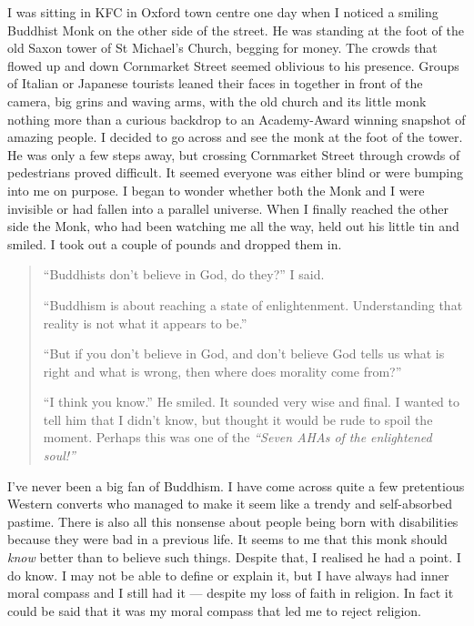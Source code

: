 \documentclass[12pt]{memoir}
\def\–{-\hskip0pt}
\begin{document}
I was sitting in KFC in Oxford town centre one day
when I noticed a smiling Buddhist Monk on the other side of the street.
He was standing at the foot of the old Saxon tower of St Michael’s Church,
begging for money.
The crowds that flowed up and down Cornmarket Street
seemed oblivious to his presence.
Groups of Italian or Japanese tourists leaned their faces
in together in front of the camera,
big grins and waving arms,
with the old church and its little monk nothing more than a curious
backdrop to an Academy-Award winning snapshot of amazing people.
I decided to go across and see the monk at the foot of the tower.
He was only a few steps away, but crossing Cornmarket Street
through crowds of pedestrians proved difficult.
It seemed everyone was either blind or were bumping into me on purpose.
I began to wonder whether both the Monk and I were invisible
or had fallen into a parallel universe.
When I finally reached the other side the Monk,
who had been watching me all the way,
held out his little tin and smiled.
I took out a couple of pounds and dropped them in.

\begin{quote}
“Buddhists don’t believe in God, do they?” I said.

“Buddhism is about reaching a state of enlightenment.
Understanding that reality is not what it appears to be.”

“But if you don’t believe in God,
and don’t believe God tells us what is right and what is wrong,
then where does morality come from?”

“I think you know.” He smiled.
It sounded very wise and final.
I wanted to tell him that I didn’t know,
but thought it would be rude to spoil the moment.
Perhaps this was one of the \emph{“Seven AHAs of the enlightened soul!”}
\end{quote}

I’ve never been a big fan of Buddhism.
I have come across quite a few pretentious Western converts
who managed to make it seem like a trendy and self\–absorbed pastime.
There is also all this nonsense about people being born
with disabilities because they were bad in a previous life.
It seems to me that this monk should \emph{know} better
than to believe such things.
Despite that, I realised he had a point.
I do know. I may not be able to define or explain it,
but I have always had inner moral compass and I still had it —
despite my loss of faith in religion.
In fact it could be said that it was my moral compass
that led me to reject religion.
\end{document}
